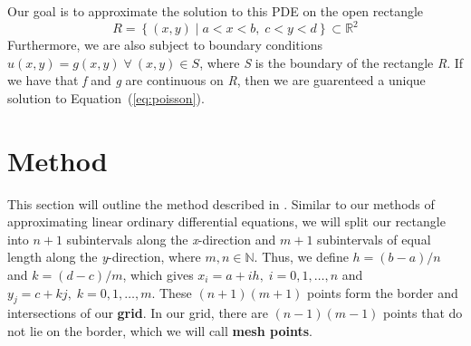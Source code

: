 \documentclass[12pt, titlepage]{article}
\begin{document}
    Our goal is to approximate the solution to this PDE on the open rectangle 
    \begin{equation*}
        R = \left\{(x,y)\; |\; a < x < b,\; c < y < d\right\} \subset \mathbb{R}^2
    \end{equation*}
    Furthermore, we are also subject to boundary conditions $u(x,y) = g(x,y)\;\forall\:(x,y)\in S$, where \textit{S} is
    the boundary of the rectangle \textit{R}. If we have that \textit{f} and \textit{g} are continuous on \textit{R}, then 
    we are guarenteed a unique solution to Equation~(\ref{eq:poisson}).
    \section{Method}
    This section will outline the method described in \cite{burden_faires_2011}. Similar to our methods of approximating linear ordinary differential equations, we will split our rectangle into
    $n+1$ subintervals along the \textit{x}-direction and $m+1$ subintervals of equal length along the \textit{y}-direction, where $m,n \in \mathbb{N}$.
    Thus, we define $h=(b-a)/n$ and $k=(d-c)/m$, which gives $x_i = a  + ih,\; i=0,1,\dots,n$ and $y_j = c + kj, \; k=0,1,\dots,m$. These $(n+1)(m+1)$ points
    form the border and intersections of our \textbf{grid}. In our grid, there are $(n-1)(m-1)$ points that do not lie on the border, which we will call \textbf{mesh points}.
\end{document}
